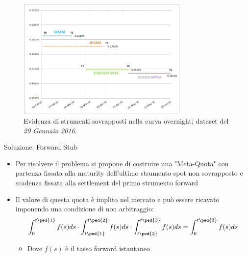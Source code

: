 \begin{tframe}
\begin{figure}[!h]
\centering
\includegraphics[width=0.75\textwidth]{overlappingsol.png}
\caption{Evidenza di strumenti sovrapposti nella curva overnight; dataset del {\it 29 Gennaio 2016}.}
\label{fig:overlappingsol}
\end{figure}
\end{tframe}
\begin{tframe}{Soluzione: Forward Stub}
\begin{itemize}
\item Per risolvere il problema si propone di costruire una "Meta-Quota" con partenza fissata alla maturity dell'ultimo strumento spot non sovrapposto e scadenza fissata alla settlement del primo strumento forward
\item Il valore di questa quota è implito nel mercato e può essere ricavato imponendo una condizione di non arbitraggio:
$$\int_{0}^{t\ped{1}} f(s)ds \cdot \int_{t\ped{1}}^{t\ped{2}} f(s)ds \cdot \int_{t\ped{2}}^{t\ped{3}} f(s)ds = \int_{0}^{t\ped{3}} f(s)ds$$ 
   \begin{itemize}
   \item Dove $f(s)$ è il tasso forward istantaneo
   \end{itemize}
\end{itemize}
\end{tframe}
